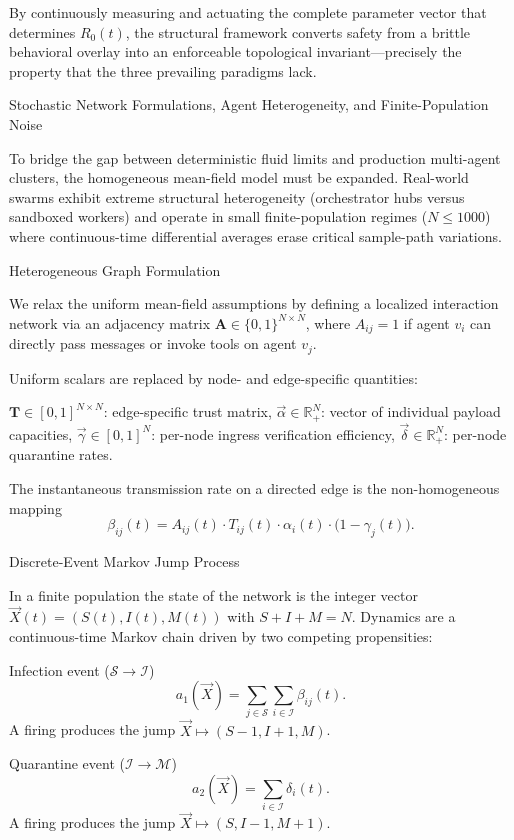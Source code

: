 By continuously measuring and actuating the complete parameter vector that determines \(R_0(t)\), the structural framework converts safety from a brittle behavioral overlay into an enforceable topological invariant—precisely the property that the three prevailing paradigms lack.

Stochastic Network Formulations, Agent Heterogeneity, and Finite-Population Noise

To bridge the gap between deterministic fluid limits and production multi-agent clusters, the homogeneous mean-field model must be expanded. Real-world swarms exhibit extreme structural heterogeneity (orchestrator hubs versus sandboxed workers) and operate in small finite-population regimes (\(N\le 1000\)) where continuous-time differential averages erase critical sample-path variations.

Heterogeneous Graph Formulation

We relax the uniform mean-field assumptions by defining a localized interaction network via an adjacency matrix \(\mathbf{A}\in\{0,1\}^{N\times N}\), where \(A_{ij}=1\) if agent \(v_i\) can directly pass messages or invoke tools on agent \(v_j\).

Uniform scalars are replaced by node- and edge-specific quantities:

\(\mathbf{T}\in[0,1]^{N\times N}\): edge-specific trust matrix,
\(\vec{\alpha}\in\mathbb{R}_+^N\): vector of individual payload capacities,
\(\vec{\gamma}\in[0,1]^N\): per-node ingress verification efficiency,
\(\vec{\delta}\in\mathbb{R}_+^N\): per-node quarantine rates.

The instantaneous transmission rate on a directed edge is the non-homogeneous mapping
\[
\beta_{ij}(t)=A_{ij}(t)\cdot T_{ij}(t)\cdot\alpha_i(t)\cdot\bigl(1-\gamma_j(t)\bigr).
\]

Discrete-Event Markov Jump Process

In a finite population the state of the network is the integer vector \(\vec{X}(t)=(S(t),I(t),M(t))\) with \(S+I+M=N\). Dynamics are a continuous-time Markov chain driven by two competing propensities:

Infection event (\(\mathcal{S}\to\mathcal{I}\))  
   \[
   a_1(\vec{X})=\sum_{j\in\mathcal{S}}\sum_{i\in\mathcal{I}}\beta_{ij}(t).
   \]
   A firing produces the jump \(\vec{X}\mapsto(S-1,I+1,M)\).

Quarantine event (\(\mathcal{I}\to\mathcal{M}\))  
   \[
   a_2(\vec{X})=\sum_{i\in\mathcal{I}}\delta_i(t).
   \]
   A firing produces the jump \(\vec{X}\mapsto(S,I-1,M+1)\).

